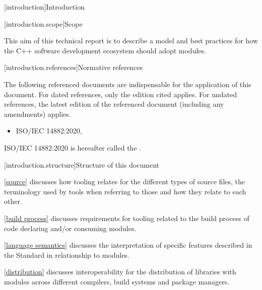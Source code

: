
[introduction]{Introduction}

[introduction.scope]{Scope}

\pnum
{}%
This aim of this technical report is to describe a model and best practices for
how the C++ software development ecosystem should adopt modules.
%

%
[introduction.references]{Normative references}

\pnum
{}%
The following referenced documents are indispensable for the application of this
document.
For dated references, only the edition cited applies.
For undated references, the latest edition of the referenced document
(including any amendments) applies.

\begin{itemize}
\item ISO/IEC 14882:2020, 
\end{itemize}

\pnum
ISO/IEC 14882:2020 is hereafter called the .

[introduction.structure]{Structure of this document}

%

\pnum \ref{source} discusses how tooling relates for the different
types of \Cpp{} source files, the terminology used by tools when
referring to those and how they relate to each other.

\pnum \ref{build process} discusses requirements for tooling related to the
build process of code declaring and/or consuming \Cpp{} modules.

\pnum \ref{language semantics} discusses the interpretation of specific
features described in the \Cpp{} Standard in relationship to modules.

\pnum \ref{distribution} discusses interoperability for the distribution of
\Cpp{} libraries with modules across different compilers, build
systems and package managers.

%
